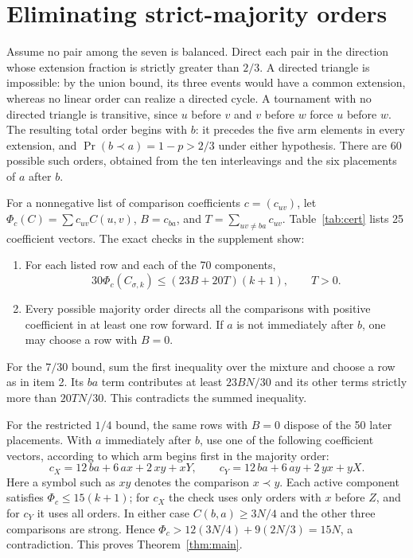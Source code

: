\documentclass[11pt]{article}
\newcommand{\PrE}{\Pr}
\begin{document}
\section{Eliminating strict-majority orders}
Assume no pair among the seven is balanced. Direct each pair in the
direction whose extension fraction is strictly greater than $2/3$.
A directed triangle is impossible: by the union bound, its three
events would have a common extension, whereas no linear order can
realize a directed cycle. A tournament with no directed triangle is
transitive, since $u$ before $v$ and $v$ before $w$ force $u$ before
$w$. The resulting total order begins with $b$: it precedes the five
arm elements in every extension, and $\PrE(b\prec a)=1-p>2/3$
under either hypothesis. There are 60 possible such orders, obtained
from the ten interleavings and the six placements of $a$ after $b$.

For a nonnegative list of comparison coefficients $c=(c_{uv})$,
let $\Phi_c(C)=\sum c_{uv}C(u,v)$, $B=c_{ba}$, and
$T=\sum_{uv\ne ba}c_{uv}$. Table~\ref{tab:cert} lists 25 coefficient
vectors. The exact checks in the supplement show:
\begin{enumerate}
\item For each listed row and each of the 70 components,
\[
 30\Phi_c(C_{\sigma,k})\le (23B+20T)(k+1),\qquad T>0.
\]
\item Every possible majority order directs all the comparisons with
positive coefficient in at least one row forward. If $a$ is not
immediately after $b$, one may choose a row with $B=0$.
\end{enumerate}
For the $7/30$ bound, sum the first inequality over the mixture and
choose a row as in item 2. Its $ba$ term contributes at least
$23BN/30$ and its other terms strictly more than $20TN/30$.
This contradicts the summed inequality.

For the restricted $1/4$ bound, the same rows with $B=0$ dispose
of the 50 later placements. With $a$ immediately after $b$, use
one of the following coefficient vectors, according to which arm
begins first in the majority order:
\[
 c_X=12\,ba+6\,ax+2\,xy+xY,\qquad
 c_Y=12\,ba+6\,ay+2\,yx+yX.
\]
Here a symbol such as $xy$ denotes the comparison $x\prec y$.
Each active component satisfies $\Phi_c\le15(k+1)$; for $c_X$ the
check uses only orders with $x$ before $Z$, and for $c_Y$ it uses
all orders. In either case $C(b,a)\ge 3N/4$ and the other three
comparisons are strong. Hence $\Phi_c>12(3N/4)+9(2N/3)=15N$,
a contradiction. This proves Theorem~\ref{thm:main}.
\end{document}
